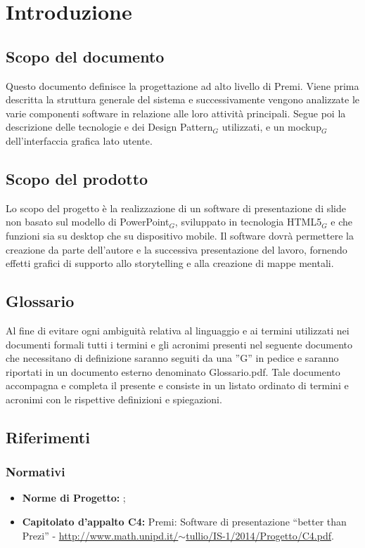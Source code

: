 \section{Introduzione}
\subsection{Scopo del documento}
Questo documento definisce la progettazione ad alto livello di Premi. Viene prima descritta la struttura generale del sistema e successivamente vengono analizzate le varie componenti software in relazione alle loro attività principali. Segue poi la descrizione delle tecnologie e dei Design Pattern$_{G}$ utilizzati, e un mockup$_{G}$ dell'interfaccia grafica lato utente.

\subsection{Scopo del prodotto}
Lo scopo del progetto è la realizzazione di un software di presentazione di slide non basato sul modello di PowerPoint$_{G}$, sviluppato in tecnologia HTML5$_{G}$ e che funzioni sia su desktop che su dispositivo mobile. Il software dovrà permettere la creazione da parte dell'autore e la successiva presentazione del lavoro, fornendo effetti grafici di supporto allo storytelling e alla creazione di mappe mentali. 

\subsection{Glossario}
Al fine di evitare ogni ambiguità relativa al linguaggio e ai termini utilizzati nei documenti formali tutti i termini e gli acronimi presenti nel seguente documento che necessitano di definizione saranno seguiti da una ”G” in pedice e saranno riportati in un documento esterno denominato Glossario.pdf. Tale documento accompagna e completa il presente e consiste in un listato ordinato di termini e acronimi con le rispettive definizioni e spiegazioni.

\subsection{Riferimenti}
\subsubsection{Normativi}
\begin{itemize}
	\item \textbf{Norme di Progetto:} \textit{\NdP};
	\item \textbf{Capitolato d'appalto C4:} Premi: Software di presentazione ``better than Prezi'' - \href{http://www.math.unipd.it/~tullio/IS-1/2014/Progetto/C4.pdf}{http://www.math.unipd.it/$\sim$tullio/IS-1/2014/Progetto/C4.pdf}.
\end{itemize}
